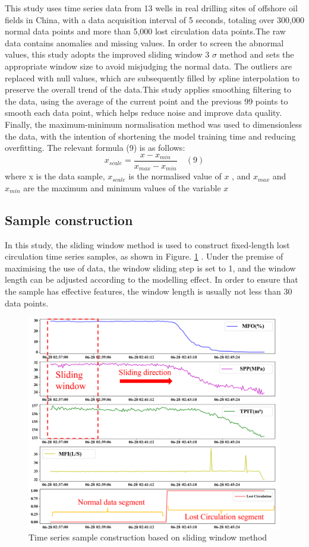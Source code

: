 \documentclass[journal,article,submit,pdftex,moreauthors]{Definitions/mdpi}
\begin{document}
This study uses time series data from 13 wells in real drilling sites of offshore oil fields in China, with a data acquisition interval of 5 seconds, totaling over 300,000 normal data points and more than 5,000 lost circulation data points.The raw data contains anomalies and missing values. In order to screen the abnormal values, this study adopts the improved sliding window 3 \(\sigma\) method and sets the appropriate window size to avoid misjudging the normal data. The outliers are replaced with null values, which are subsequently filled by spline interpolation to preserve the overall trend of the data.This study applies smoothing filtering to the data, using the average of the current point and the previous 99 points to smooth each data point, which helps reduce noise and improve data quality. Finally, the maximum-minimum normalisation method was used to dimensionless the data, with the intention of shortening the model training time and reducing overfitting. The relevant formula (9) is as follows:
$$ x _ { s c a l e } = \frac { x - x _ { m i n } } { x _ { m a x } - x _ { m i n } }\quad (9)$$
where x is the data sample, \({{x}_{scale}}\) is the normalised value of \({{x}}\) , and \({{x}_{max}}\)  and \({{x}_{min}}\)  are the maximum and minimum values of the variable \({{x}}\)
\subsection{Sample construction}

In this study, the sliding window method is used to construct fixed-length  lost circulation time series samples, as shown in Figure. \ref{fig:Time series sample construction based on sliding window method} . Under the premise of maximising the use of data, the window sliding step is set to 1, and the window length can be adjusted according to the modelling effect. In order to ensure that the sample has effective features, the window length is usually not less than 30 data points.

\begin{figure}[h]
    \centering
    \includegraphics[width=0.75\linewidth]{图片/滑动窗口.png}
    \caption{Time series sample construction based on sliding window method}
    \label{fig:Time series sample construction based on sliding window method}
\end{figure}
\end{document}
